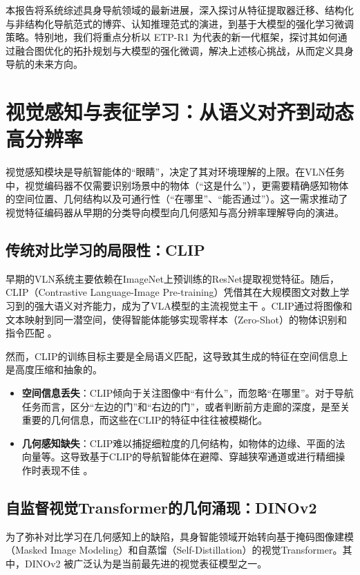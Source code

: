 本报告将系统综述具身导航领域的最新进展，深入探讨从特征提取器迁移、结构化与非结构化导航范式的博弈、认知推理范式的演进，到基于大模型的强化学习微调策略。特别地，我们将重点分析以 ETP-R1   为代表的新一代框架，探讨其如何通过融合图优化的拓扑规划与大模型的强化微调，解决上述核心挑战，从而定义具身导航的未来方向。

\section{视觉感知与表征学习：从语义对齐到动态高分辨率}
视觉感知模块是导航智能体的“眼睛”，决定了其对环境理解的上限。在VLN任务中，视觉编码器不仅需要识别场景中的物体（“这是什么”），更需要精确感知物体的空间位置、几何结构以及可通行性（“在哪里”、“能否通过”）。这一需求推动了视觉特征编码器从早期的分类导向模型向几何感知与高分辨率理解导向的演进。

\subsection{传统对比学习的局限性：CLIP}
早期的VLN系统主要依赖在ImageNet上预训练的ResNet提取视觉特征。随后，CLIP（Contrastive Language-Image Pre-training）凭借其在大规模图文对数上学习到的强大语义对齐能力，成为了VLA模型的主流视觉主干 \cite{radford2021learning}。CLIP通过将图像和文本映射到同一潜空间，使得智能体能够实现零样本（Zero-Shot）的物体识别和指令匹配  。

然而，CLIP的训练目标主要是全局语义匹配，这导致其生成的特征在空间信息上是高度压缩和抽象的。
\begin{itemize}
    \item \textbf{空间信息丢失}：CLIP倾向于关注图像中“有什么”，而忽略“在哪里”。对于导航任务而言，区分“左边的门”和“右边的门”，或者判断前方走廊的深度，是至关重要的几何信息，而这些在CLIP的特征中往往被模糊化。
    \item \textbf{几何感知缺失}：CLIP难以捕捉细粒度的几何结构，如物体的边缘、平面的法向量等。这导致基于CLIP的导航智能体在避障、穿越狭窄通道或进行精细操作时表现不佳 \cite{dinov2}。
\end{itemize}

\subsection{自监督视觉Transformer的几何涌现：DINOv2}
为了弥补对比学习在几何感知上的缺陷，具身智能领域开始转向基于掩码图像建模（Masked Image Modeling）和自蒸馏（Self-Distillation）的视觉Transformer。其中，DINOv2 \cite{dinov2} 被广泛认为是当前最先进的视觉表征模型之一。

